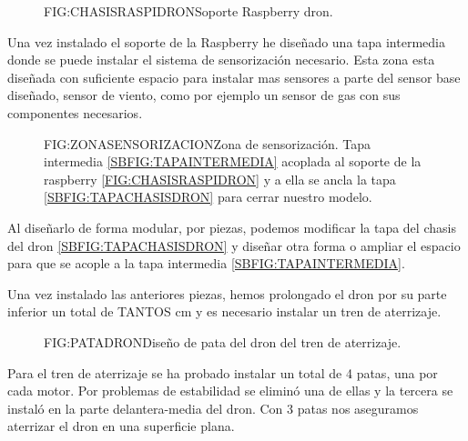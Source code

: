 \begin{description}
\begin{description}
\begin{figure}[Chasis raspi dron]{FIG:CHASISRASPIDRON}{Soporte Raspberry dron.}
\end{figure}

\item[Zona de sensorización: ]

Una vez instalado el soporte de la Raspberry he diseñado una tapa intermedia donde se puede instalar el sistema de sensorización necesario. Esta zona esta diseñada con suficiente espacio para instalar mas sensores a parte del sensor base diseñado, sensor de viento, como por ejemplo un sensor de gas con sus componentes necesarios.

\begin{figure}[Zona sensorización dron]{FIG:ZONASENSORIZACION}{Zona de sensorización. Tapa intermedia \ref{SBFIG:TAPAINTERMEDIA} acoplada al soporte de la raspberry \ref{FIG:CHASISRASPIDRON} y a ella se ancla la tapa \ref{SBFIG:TAPACHASISDRON} para cerrar nuestro modelo.}
	
   \quad
  
\end{figure} 

Al diseñarlo de forma modular, por piezas, podemos modificar la tapa del chasis del dron \ref{SBFIG:TAPACHASISDRON} y diseñar otra forma o ampliar el espacio para que se acople a la tapa intermedia  \ref{SBFIG:TAPAINTERMEDIA}.

\item[Elementos de aterrizaje]

Una vez instalado las anteriores piezas, hemos prolongado el dron por su parte inferior un total de TANTOS cm y es necesario instalar un tren de aterrizaje.

\begin{figure}[Pata dron]{FIG:PATADRON}{Diseño de pata del dron del tren de aterrizaje.}
\end{figure}
\end{description}

Para el tren de aterrizaje se ha probado instalar un total de 4 patas, una por cada motor. Por problemas de estabilidad se eliminó una de ellas y la tercera se instaló en la parte delantera-media del dron. Con 3 patas nos aseguramos aterrizar el dron en una superficie plana.


\end{description}
